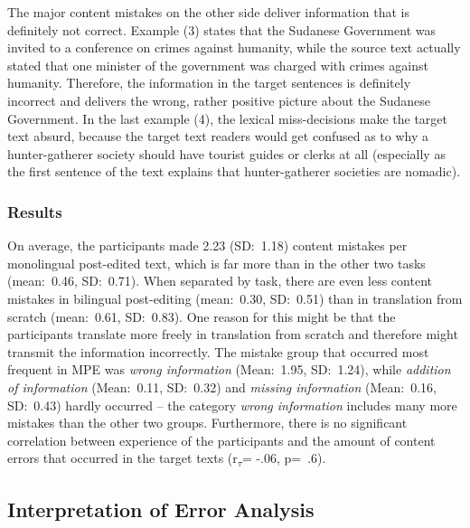 \documentclass[output=paper]{langsci/langscibook}
\begin{document}
The major content mistakes on the other side deliver information that is definitely not correct. Example (3) states that the Sudanese Government was invited to a conference on crimes against humanity, while the source text actually stated that one minister of the government was charged with crimes against humanity. Therefore, the information in the target sentences is definitely incorrect and delivers the wrong, rather positive picture about the Sudanese Government. In the last example (4), the lexical miss-decisions make the target text absurd, because the target text readers would get confused as to why a hunter-gatherer society should have tourist guides or clerks at all (especially as the first sentence of the text explains that hunter-gatherer societies are nomadic).


\subsubsection{Results\label{nitzke:sec:Results}}

\largerpage[-2]
On average, the participants made 2.23 (SD:~1.18) content mistakes per monolingual post-edited text, which is far more than in the other two tasks (mean:~0.46, SD:~0.71). When separated by task, there are even less content mistakes in bilingual post-editing (mean:~0.30, SD:~0.51) than in translation from scratch (mean:~0.61, SD:~0.83). One reason for this might be that the participants translate more freely in translation from scratch and therefore might transmit the information incorrectly. The mistake group that occurred most frequent in MPE was \textit{wrong information} (Mean:~1.95, SD:~1.24), while \textit{addition of information} (Mean:~0.11, SD:~0.32) and \textit{missing information }(Mean:~0.16, SD:~0.43) hardly occurred -- the category \textit{wrong information }includes many more mistakes than the other two groups. Furthermore, there is no significant correlation between experience of the participants and the amount of content errors that occurred in the target texts (r\textsubscript{$\tau $}= -.06, p=~.6).

\subsection{Interpretation of Error Analysis\label{nitzke:sec:InterpretationOfErrorAnalysis}}
\end{document}
